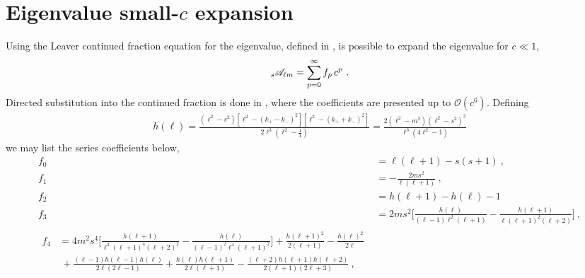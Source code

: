 
\chapter{Eigenvalue small-$c$ expansion}
\label{AppendixEigenvalues}

Using the Leaver continued fraction equation for the eigenvalue, defined in , is possible to expand the eigenvalue for $c\ll 1$,
\begin{align}
    \uu[s]{\mathscr{A}}{\ell m} = \sum_{p=0}^\infty f_p \,c^p ~.
\end{align}
Directed substitution into the continued fraction is done in \cite{Fackerell1977,Seidel1989}, where the coefficients are presented up to $\mathscr{O}(c^6)$.
Defining
\begin{align}
    h(\ell) = \frac{\left(\ell^2-s^2\right) \left[\ell^2-(k_{+}-k_{-})^2\right] \left[\ell^2-(k_{+}+k_{-})^2\right]}{2 \ell^3 \left(\ell^2-\frac{1}{4}\right)} = \frac{2 \left(\ell^2-m^2\right) \left(\ell^2-s^2\right)^2}{\ell^3 \left(4 \ell^2-1\right)}
\end{align}
we may list the series coefficients below,
\begin{subequations}
\begin{align}
    f_0 &= \ell (\ell+1) - s(s+1) ~, \\[0.15cm]
    f_1 &= -\frac{2 m s^2}{\ell (\ell+1)} ~,\\[0.15cm]
    f_2 &= h(\ell+1) - h(\ell) -1 \\[0.15cm]
    f_3 &= 2 m s^2 \bigg[ \frac{ h(\ell)}{(\ell-1) \ell^2 (\ell+1)}-\frac{h(\ell+1)}{\ell (\ell+1)^2
    (\ell+2)} \bigg] ~, \\[0.15cm]
    \begin{split}
        f_4 &= 4 m^2 s^4 \bigg[ \frac{h(\ell+1)}{\ell^2 (\ell+1)^4 (\ell+2)^2} 
        - \frac{h(\ell)}{(\ell-1)^2 \ell^4 (\ell+1)^2} \bigg] 
        +\frac{h(\ell+1)^2}{2 (\ell+1)} - \frac{h(\ell)^2}{2\ell} \\
        &~ + \frac{(\ell-1) h(\ell-1) h(\ell)}{2 \ell (2\ell-1)} + \frac{h(\ell) h(\ell+1)}{2 \ell (\ell+1)} 
        - \frac{(\ell+2) h(\ell+1) h(\ell+2)}{2(\ell+1) (2 \ell+3)} ~,
    \end{split}
\end{align}
\end{subequations}
